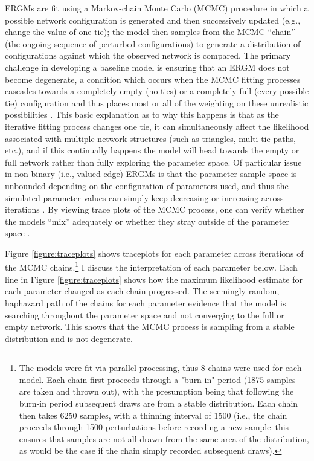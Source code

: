 \documentclass[12pt,a4paper,titlepage]{article}
\begin{document}
ERGMs are fit using a Markov-chain Monte Carlo (MCMC) procedure in which a possible network configuration is generated and then successively updated (e.g., change the value of one tie); the model then samples from the MCMC ``chain’’ (the ongoing sequence of perturbed configurations) to generate a distribution of configurations against which the observed network is compared. The primary challenge in developing a baseline model is ensuring that an ERGM does not become degenerate, a condition which occurs when the MCMC fitting processes cascades towards a completely empty (no ties) or a completely full (every possible tie) configuration and thus places most or all of the weighting on these unrealistic possibilities \parencite{handcock2003, kolaczyk2009}. This basic explanation as to why this happens is that as the iterative fitting process changes one tie, it can simultaneously affect the likelihood associated with multiple network structures (such as triangles, multi-tie paths, etc.), and if this continually happens the model will head towards the empty or full network rather than fully exploring the parameter space. Of particular issue in non-binary (i.e., valued-edge) ERGMs is that the parameter sample space is unbounded depending on the configuration of parameters used, and thus the simulated parameter values can simply keep decreasing or increasing across iterations \parencite{krivitsky2013}. By viewing trace plots of the MCMC process, one can verify whether the models “mix” adequately or whether they stray outside of the parameter space \parencite{krivitsky2012}.

Figure \ref{figure:traceplots} shows traceplots for each parameter across iterations of the MCMC chains.\footnote{The models were fit via parallel processing, thus 8 chains were used for each model. Each chain first proceeds through a "burn-in" period (1875 samples are taken and thrown out), with the presumption being that following the burn-in period subsequent draws are from a stable distribution. Each chain then takes 6250 samples, with a thinning interval of 1500 (i.e., the chain proceeds through 1500 perturbations before recording a new sample--this ensures that samples are not all drawn from the same area of the distribution, as would be the case if the chain simply recorded subsequent draws).} I discuss the interpretation of each parameter below. Each line in Figure \ref{figure:traceplots} shows how the maximum likelihood estimate for each parameter changed as each chain progressed. The seemingly random, haphazard path of the chains for each parameter evidence that the model is searching throughout the parameter space and not converging to the full or empty network. This shows that the MCMC process is sampling from a stable distribution and is not degenerate.
\end{document}
